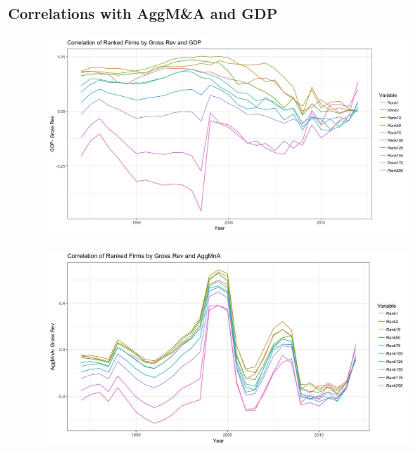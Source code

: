 \documentclass{article}
\begin{document}
\newpage
{\large \textbf{Correlations with AggM\&A and GDP} }
\begin{figure}[H]\centering
\includegraphics[width=0.85\textwidth]{../IndivTexOutput/MnAGDP-1.jpg}\end{figure}

\begin{figure}[H]\centering
\includegraphics[width=0.85\textwidth]{../IndivTexOutput/MnAGDP-2.jpg}\end{figure}
\end{document}
